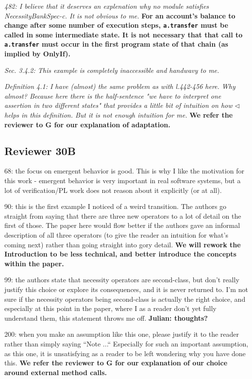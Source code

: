 \documentclass[11pt]{amsart}
\newcommand{\rev}[1]{\emph #1}
\newcommand{\us}[1]{\bf #1}
\begin{document}
{\rev {{482: I believe that it deserves an explenation why no module satisfies NecessityBankSpec-c. It is not obvious to me. }}}
{\us{For an account's balance to change after some number of execution steps, \texttt{a.transfer} must be called in some intermediate state.
It is not necessary that that call to \texttt{a.transfer} must occur in the first program state of that chain (as implied by OnlyIf).}}

{\rev {{Sec. 3.4.2: This example is completely inaccessible and handwavy to me. }}}

{\rev {{ Definition 4.1: I have (almost) the same problem as with l.442-456 here. Why almost? Because here there is the half-sentence "we have to interpret one assertion in two different states" that provides a little bit of intuition on how $\triangleleft$ helps in this definition. But it is not enough intuition for me. }}}
{\us{We refer the reviewer to G for our explanation of adaptation.}}

   
  \subsection*{Reviewer 30B}
  
   68: the focus on emergent behavior is good. This is why I like the motivation for this work - emergent behavior is very important in real software systems, but a lot of verification/PL work does not reason about it explicitly (or at all).

90: this is the first example I noticed of a weird transition. The authors go straight from saying that there are three new operators to a lot of detail on the first of those. The paper here would flow better if the authors gave an informal description of all three operators (to give the reader an intuition for what’s coming next) rather than going straight into gory detail.
{\us{We will rework the Introduction to be less technical, and better introduce the concepts within the paper.}}

99: the authors state that necessity operators are second-class, but don’t really justify this choice or explore its consequences, and it is never returned to. I’m not sure if the necessity operators being second-class is actually the right choice, and especially at this point in the paper, where I as a reader don’t yet fully understand them, this statement throws me off.
{\us{Julian: thoughts?}}

200: when you make an assumption like this one, please justify it to the reader rather than simply saying “Note ...“ Especially for such an important assumption, as this one, it is unsatisfying as a reader to be left wondering why you have done this.
{\us{We refer the reviewer to G for our explanation of our choice around external method calls.}}
\end{document}

